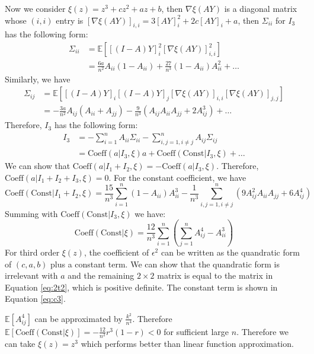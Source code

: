 \documentclass{article}
\def\E{\mathbb{E}}
\begin{document}
Now we consider $ \xi(z) = z^3 + cz^2 + az + b$, then $\nabla \xi (AY) $ is a diagonal matrix whose $(i,i)$ entry is 
 $[\nabla \xi (AY)]_{i,i} = 3 [AY]_i^2 + 2c [AY]_i + a $, then $\Sigma_{ii}$ for $I_3$ has the following form:
\begin{align*}
\Sigma_{ii} & = \E[ [(I-A)Y]_i^2 [\nabla \xi(AY)]_{i,i}^2] \\
& =  \frac{6a}{n^2} A_{ii}(1-A_{ii}) + \frac{27}{n^3} (1-A_{ii})A_{ii}^2 + \dots
\end{align*}
Similarly, we have
\begin{align*}
\Sigma_{ij} & = \E[ [(I-A)Y]_i [(I-A)Y]_j [\nabla \xi(AY)]_{i,i} [\nabla \xi(AY)]_{j,j}] \\
& = -\frac{3a}{n^2} A_{ij}(A_{ii}+A_{jj}) - \frac{9}{n^3}(A_{ij}A_{ii} A_{jj} + 2 A_{ij}^3) + \dots
\end{align*}
Therefore, $I_3$ has the following form:
\begin{align*}
I_3 & = - \sum_{i=1}^n A_{ii} \Sigma_{ii} - \sum_{i,j=1, i\neq j}^n A_{ij} \Sigma_{ij} \\
& = \textrm{Coeff}(a | I_3, \xi) a  + \textrm{Coeff}( \textrm{Const} | I_3, \xi) + \dots
\end{align*}
We can show that $\textrm{Coeff}(a | I_1 + I_2, \xi) =- \textrm{Coeff}(a | I_3, \xi)$. Therefore, $\textrm{Coeff}(a | I_1 + I_2 + I_3, \xi) = 0$.
For the constant coefficient, we have
\begin{equation*}
\textrm{Coeff}(\textrm{Const} | I_1 + I_2, \xi) = \frac{15}{n^3}\sum_{i=1}^n (1-A_{ii}) A_{ii}^3 - \frac{1}{n^3}\sum_{i,j=1,i\neq j}^n (9 A^2_{ij} A_{ii}A_{jj} + 6 A_{ij}^4)
\end{equation*}
Summing with $\textrm{Coeff}(\textrm{Const} | I_3, \xi) $ we have:
\begin{equation}\label{eq:c3}
\textrm{Coeff}(\textrm{Const} | \xi) = \frac{12}{n^3} \sum_{i=1}^n (\sum_{j=1}^n A_{ij}^4 - A_{ii}^3)
\end{equation}
For third order $\xi(z)$, the coefficient of $\epsilon^2$ can be written as the quandratic form of $(c,a,b)$ plus a constant term. We can show that the quandratic form is irrelevant with $a$ and the remaining $2\times 2 $ matrix is equal to the matrix in Equation \eqref{eq:2t2}, which is positive definite. The constant term is shown in Equation \eqref{eq:c3}.

$\E[A_{ij}^4]$ can be approximated by $\frac{k^2}{n^4}$. Therefore $\E[\textrm{Coeff}(\textrm{Const} | \xi)]=-\frac{12}{n^2} r^3(1-r) < 0 $ for sufficient large $n$. Therefore we can take $\xi(z) = z^3$ which performs better than linear function approximation.
\end{document}
